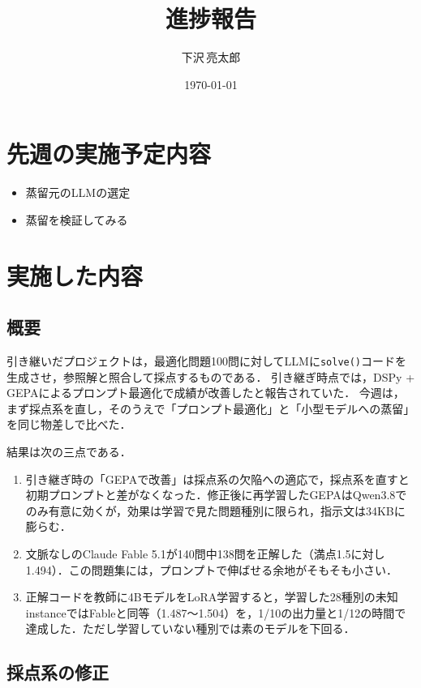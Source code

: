\documentclass[12pt,a4paper]{article}
\title{進捗報告}
\author{下沢\,亮太郎}
\date{\today}
\begin{document}
\maketitle

\section{先週の実施予定内容}

\begin{itemize}
  \item 蒸留元のLLMの選定
  \item 蒸留を検証してみる
\end{itemize}


\section{実施した内容}

\subsection{概要}

引き継いだプロジェクトは，最適化問題100問に対してLLMに\texttt{solve()}コードを生成させ，参照解と照合して採点するものである．
引き継ぎ時点では，DSPy + GEPAによるプロンプト最適化で成績が改善したと報告されていた．
今週は，まず採点系を直し，そのうえで「プロンプト最適化」と「小型モデルへの蒸留」を同じ物差しで比べた．

結果は次の三点である．

\begin{enumerate}
  \item 引き継ぎ時の「GEPAで改善」は採点系の欠陥への適応で，採点系を直すと初期プロンプトと差がなくなった．修正後に再学習したGEPAはQwen3.8でのみ有意に効くが，効果は学習で見た問題種別に限られ，指示文は34KBに膨らむ．
  \item 文脈なしのClaude Fable 5.1が140問中138問を正解した（満点1.5に対し1.494）．この問題集には，プロンプトで伸ばせる余地がそもそも小さい．
  \item 正解コードを教師に4BモデルをLoRA学習すると，学習した28種別の未知instanceではFableと同等（1.487〜1.504）を，1/10の出力量と1/12の時間で達成した．ただし学習していない種別では素のモデルを下回る．
\end{enumerate}


\subsection{採点系の修正}
\end{document}
